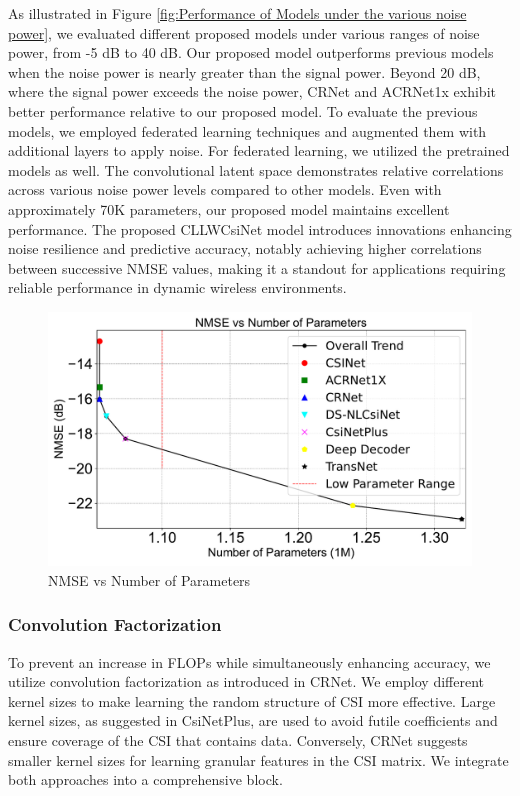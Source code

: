 \documentclass[lettersize,journal]{IEEEtran}
\begin{document}
As illustrated in Figure \ref{fig:Performance of Models under the various noise power}, we evaluated different proposed models under various ranges of noise power, from -5 dB to 40 dB. Our proposed model outperforms previous models when the noise power is nearly greater than the signal power. Beyond 20 dB, where the signal power exceeds the noise power, CRNet \cite{abn} and ACRNet1x \cite{abx} exhibit better performance relative to our proposed model. To evaluate the previous models, we employed federated learning techniques and augmented them with additional layers to apply noise. For federated learning, we utilized the pretrained models as well. The convolutional latent space demonstrates relative correlations across various noise power levels compared to other models. Even with approximately 70K parameters, our proposed model maintains excellent performance. The proposed CLLWCsiNet model introduces innovations enhancing noise resilience and predictive accuracy, notably achieving higher correlations between successive NMSE values, making it a standout for applications requiring reliable performance in dynamic wireless environments.

\begin{figure}[t]
	\centering
	\includegraphics[width=\columnwidth]{NMSEvsNofparametters.pdf}
	\caption{NMSE vs Number of Parameters}
	\label{fig:nmse-params}
\end{figure}

\subsubsection{Convolution Factorization} To prevent an increase in FLOPs while simultaneously enhancing accuracy, we utilize convolution factorization as introduced in CRNet\cite{abn}. We employ different kernel sizes to make learning the random structure of CSI more effective. Large kernel sizes, as suggested in CsiNetPlus\cite{abo}, are used to avoid futile coefficients and ensure coverage of the CSI that contains data. Conversely, CRNet\cite{abn} suggests smaller kernel sizes for learning granular features in the CSI matrix. We integrate both approaches into a comprehensive block.
\end{document}
